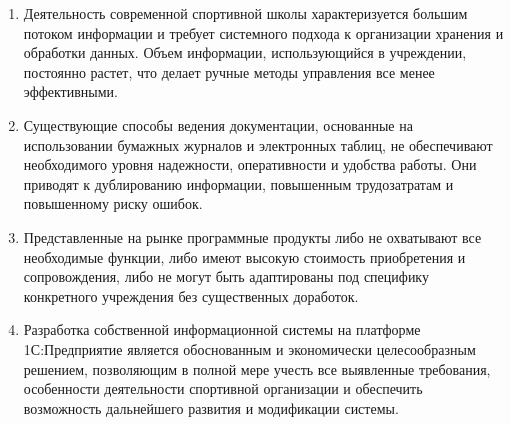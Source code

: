 \begin{enumerate}
	\item Деятельность современной спортивной школы характеризуется большим потоком информации и требует системного подхода к организации хранения и обработки данных. Объем информации, использующийся в учреждении, постоянно растет, что делает ручные методы управления все менее эффективными.
	\item Существующие способы ведения документации, основанные на использовании бумажных журналов и электронных таблиц, не обеспечивают необходимого уровня надежности, оперативности и удобства работы. Они приводят к дублированию информации, повышенным трудозатратам и повышенному риску ошибок.
	\item Представленные на рынке программные продукты либо не охватывают все необходимые функции, либо имеют высокую стоимость приобретения и сопровождения, либо не могут быть адаптированы под специфику конкретного учреждения без существенных доработок.
	\item Разработка собственной информационной системы на платформе 1С:Предприятие является обоснованным и экономически целесообразным решением, позволяющим в полной мере учесть все выявленные требования, особенности деятельности спортивной организации и обеспечить возможность дальнейшего развития и модификации системы.
\end{enumerate}